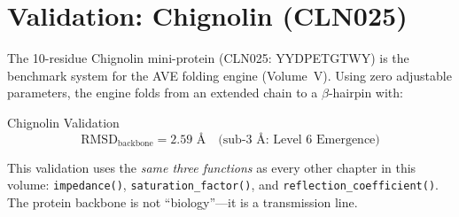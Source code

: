 \section{Validation: Chignolin (CLN025)}

The 10-residue Chignolin mini-protein (CLN025: YYDPETGTWY) is the benchmark system for the AVE folding engine (Volume~V). Using zero adjustable parameters, the engine folds from an extended chain to a $\beta$-hairpin with:
\begin{resultbox}{Chignolin Validation}
\begin{equation}
    \text{RMSD}_{\text{backbone}} = 2.59 \text{ \AA} \quad \text{(sub-3 \AA: Level 6 Emergence)}
\end{equation}
\end{resultbox}

This validation uses the \textit{same three functions} as every other chapter in this volume: \texttt{impedance()}, \texttt{saturation\_factor()}, and \texttt{reflection\_coefficient()}. The protein backbone is not ``biology''---it is a transmission line.

